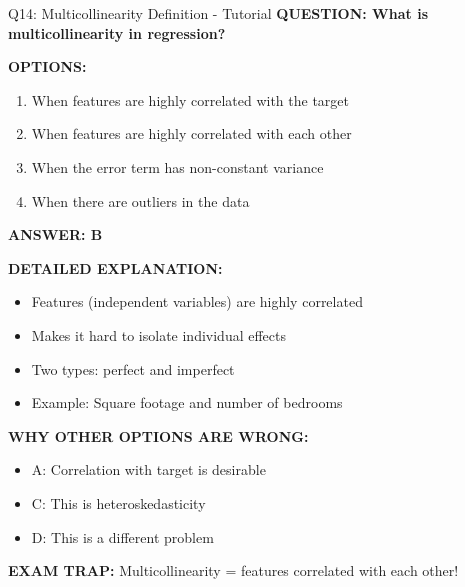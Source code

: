 \documentclass[8pt]{beamer}
\begin{document}
	\begin{frame}{Q14: Multicollinearity Definition - Tutorial}
		\fontsize{6.5}{7.5}\selectfont
		\textbf{QUESTION: What is multicollinearity in regression?}
		
		\vspace{0.1cm}
		\textbf{OPTIONS:}
		\begin{enumerate}
			\item When features are highly correlated with the target
			\item When features are highly correlated with each other
			\item When the error term has non-constant variance
			\item When there are outliers in the data
		\end{enumerate}
		
		\vspace{0.1cm}
		\textcolor{myblue}{\textbf{ANSWER: B}}
		
		\vspace{0.1cm}
		\textbf{DETAILED EXPLANATION:}
		\begin{itemize}
			\item Features (independent variables) are highly correlated
			\item Makes it hard to isolate individual effects
			\item Two types: perfect and imperfect
			\item Example: Square footage and number of bedrooms
		\end{itemize}
		
		\vspace{0.1cm}
		\textcolor{myred}{\textbf{WHY OTHER OPTIONS ARE WRONG:}}
		\begin{itemize}
			\item \textcolor{myred}{A:} Correlation with target is desirable
			\item \textcolor{myred}{C:} This is heteroskedasticity
			\item \textcolor{myred}{D:} This is a different problem
		\end{itemize}
		
		\textcolor{myred}{\textbf{EXAM TRAP:}} Multicollinearity = \textcolor{myblue}{features correlated with each other}!
	\end{frame}
	
\end{document}
